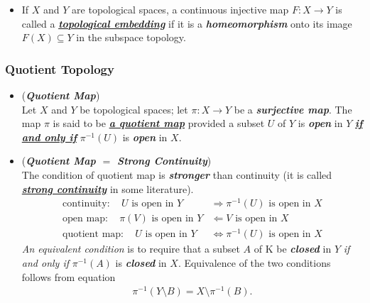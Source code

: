 \documentclass[11pt]{article}
\begin{document}
\begin{itemize}
\item \begin{definition}
If $X$ and $Y$ are topological spaces, a continuous injective map $F: X \rightarrow Y$ is called a \underline{\emph{\textbf{topological embedding}}} if it is a \emph{\textbf{homeomorphism}} onto its image $F(X) \subseteq Y$ in the subspace topology.
\end{definition}
\end{itemize}

\subsubsection{Quotient Topology}
\begin{itemize}
\item \begin{definition} (\emph{\textbf{Quotient Map}})\\
Let $X$ and $Y$ be topological spaces; let $\pi : X \rightarrow Y$ be a \emph{\textbf{surjective map}}. The map $\pi$ is said to be \underline{\emph{\textbf{a quotient map}}} provided a subset $U$ of $Y$ is \emph{\textbf{open}} in $Y$ \underline{\emph{\textbf{if and only if}}} $\pi^{-1}(U)$ is \emph{\textbf{open}} in $X$.
\end{definition}

\item \begin{remark}(\emph{\textbf{Quotient Map $=$ Strong Continuity}})\\
The condition of quotient map is \emph{\textbf{stronger}} than continuity (it is called \underline{\emph{\textbf{strong continuity}}} in some literature). 
\begin{align*}
\text{continuity}: \quad U \text{ is open in }Y & \Rightarrow \pi^{-1}(U) \text{ is open in }X\\
\text{open map}: \quad \pi(V) \text{ is open in }Y & \Leftarrow V \text{ is open in }X\\
\text{quotient map}: \quad U \text{ is open in }Y & \Leftrightarrow \pi^{-1}(U) \text{ is open in }X
\end{align*}
\emph{An equivalent condition} is to require that a subset $A$ of K be \emph{\textbf{closed}} in $Y$ \emph{if and only if} $\pi^{-1}(A)$ is \emph{\textbf{closed}} in $X$. Equivalence of the two conditions follows from equation
\begin{align*}
\pi^{-1}(Y \setminus B) = X \setminus \pi^{-1}(B).
\end{align*}
\end{remark}


\end{itemize}
\end{document}
